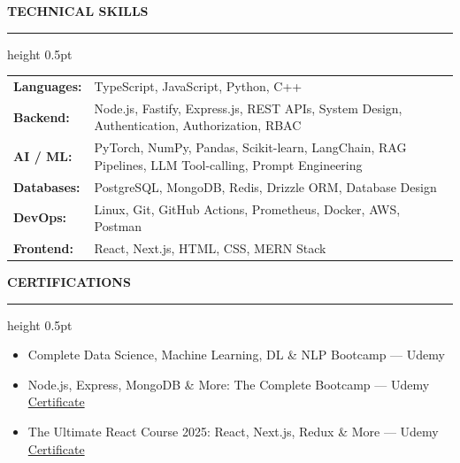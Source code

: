 \documentclass[a4paper,10pt]{article}
\newcommand{\fontsizesection}{\fontsize{8.2}{11}\selectfont}
\newcommand{\fontsizebody}{\fontsize{9}{14}\selectfont}
\newcommand{\resumesection}[1]{%
    \vspace{8pt}
    {\color{accent}\fontsizesection\textbf{\MakeUppercase{#1}}}
    \vspace{2pt}
    {\color{rule}\hrule height 0.5pt}
    \vspace{4pt}
}
\begin{document}
\resumesection{Technical Skills}
\vspace{1pt}
\begin{tabularx}{\textwidth}{@{}p{28mm} X@{}}
    \textbf{Languages:} & {\fontsizebody TypeScript, JavaScript, Python, C++} \\
    \textbf{Backend:} & {\fontsizebody Node.js, Fastify, Express.js, REST APIs, System Design, Authentication, Authorization, RBAC} \\
    \textbf{AI / ML:} & {\fontsizebody PyTorch, NumPy, Pandas, Scikit-learn, LangChain, RAG Pipelines, LLM Tool-calling, Prompt Engineering} \\
    \textbf{Databases:} & {\fontsizebody PostgreSQL, MongoDB, Redis, Drizzle ORM, Database Design} \\
    \textbf{DevOps:} & {\fontsizebody Linux, Git, GitHub Actions, Prometheus, Docker, AWS, Postman} \\
    \textbf{Frontend:} & {\fontsizebody React, Next.js, HTML, CSS, MERN Stack} \\
\end{tabularx}

\resumesection{Certifications}
\begin{itemize}[leftmargin=12pt, labelsep=6pt, itemsep=1.5pt, topsep=0pt, parsep=0pt]
    \item[\raisebox{0.25ex}{\tiny$\bullet$}] {\fontsizebody Complete Data Science, Machine Learning, DL \& NLP Bootcamp — Udemy}
    \item[\raisebox{0.25ex}{\tiny$\bullet$}] {\fontsizebody Node.js, Express, MongoDB \& More: The Complete Bootcamp — Udemy \hspace{3pt} \href{https://www.udemy.com/certificate/UC-3b083073-814e-4f53-8e5f-92256127e32e/}{Certificate}}
    \item[\raisebox{0.25ex}{\tiny$\bullet$}] {\fontsizebody The Ultimate React Course 2025: React, Next.js, Redux \& More — Udemy \hspace{3pt} \href{https://www.udemy.com/certificate/UC-1594f46f-739b-4902-9dee-7cf213e7dbb7/}{Certificate}}
\end{itemize}
\end{document}

